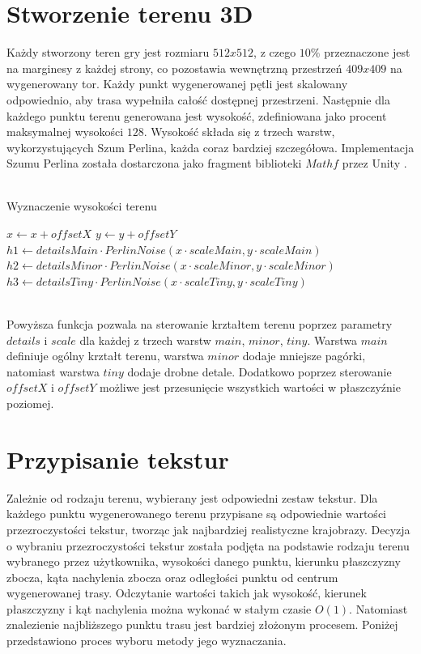\section{Stworzenie terenu 3D}
Każdy stworzony teren gry jest rozmiaru $512 x 512$, z czego $10\%$ przeznaczone jest na marginesy z każdej strony, co pozostawia wewnętrzną przestrzeń $409 x 409$ na wygenerowany tor. Każdy punkt wygenerowanej pętli jest skalowany odpowiednio, aby trasa wypełniła całość dostępnej przestrzeni. Następnie dla każdego punktu terenu generowana jest wysokość, zdefiniowana jako procent maksymalnej wysokości $128$. Wysokość składa się z trzech warstw, wykorzystujących Szum Perlina, każda coraz bardziej szczegółowa. Implementacja Szumu Perlina została dostarczona jako fragment biblioteki $Mathf$ przez Unity \cite{PerlinNoise}.
\\\\
\begin{algorithm}[H]
    \caption{Wyznaczenie wysokości terenu}\label{alg}
    $x \gets x + offsetX$\;
    $y \gets y + offsetY$\;
    $h1 \gets detailsMain \cdot PerlinNoise(x \cdot scaleMain, y \cdot scaleMain)$\;
    $h2 \gets detailsMinor \cdot PerlinNoise(x \cdot scaleMinor, y \cdot scaleMinor)$\;
    $h3 \gets detailsTiny \cdot PerlinNoise(x \cdot scaleTiny, y \cdot scaleTiny)$\;
\end{algorithm}
\phantom{.}\\
Powyższa funkcja pozwala na sterowanie krztałtem terenu poprzez parametry $details$ i $scale$ dla każdej z trzech warstw $main$, $minor$, $tiny$. Warstwa $main$ definiuje ogólny krztałt terenu, warstwa $minor$ dodaje mniejsze pagórki, natomiast warstwa $tiny$ dodaje drobne detale. Dodatkowo poprzez sterowanie $offsetX$ i $offsetY$ możliwe jest przesunięcie wszystkich wartości w płaszczyźnie poziomej.

\section{Przypisanie tekstur}
Zależnie od rodzaju terenu, wybierany jest odpowiedni zestaw tekstur. Dla każdego punktu wygenerowanego terenu przypisane są odpowiednie wartości przezroczystości tekstur, tworząc jak najbardziej realistyczne krajobrazy. Decyzja o wybraniu przezroczystości tekstur została podjęta na podstawie rodzaju terenu wybranego przez użytkownika, wysokości danego punktu, kierunku płaszczyzny zbocza, kąta nachylenia zbocza oraz odległości punktu od centrum wygenerowanej trasy. Odczytanie wartości takich jak wysokość, kierunek płaszczyzny i kąt nachylenia można wykonać w stałym czasie $O(1)$. Natomiast znalezienie najbliższego punktu trasu jest bardziej złożonym procesem. Poniżej przedstawiono proces wyboru metody jego wyznaczania.

